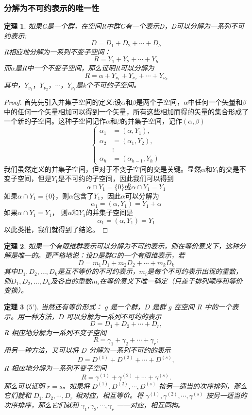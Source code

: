 \documentclass{ctexart}%
\newtheorem{theorem}{定理}
\begin{document}
\subsubsection{分解为不可约表示的唯一性}
\begin{theorem}
    如果G是一个群，在空间R中群G有一个表示D，D可以分解为一系列不可约表示:
    \[D = D_1+D_2+\cdots + D_h\]
    R相应地分解为一系列不变子空间：
    \[R = Y_1+Y_2+\cdots + Y_h\]
    而$\alpha$是R中一个不变子空间，那么证明R可以分解为
    \[R= \alpha+Y_{\nu_1}+Y_{\nu_2}+\cdots+Y_{\nu_k}\]
    其中，$Y_{\nu_1}，Y_{\nu_2}，\cdots，Y_{\nu_k}$是k个不可约子空间。
\end{theorem}
\begin{proof}
    首先先引入并集子空间的定义:设$\alpha$和$\beta$是两个子空间，$\alpha$中任何一个矢量和$\beta$中的任何一个矢量相加可以得到一个矢量，所有这些相加而得的矢量的集合形成了一个新的子空间。这种子空间记作$\alpha$和$\beta$的并集子空间，记作$\left( \alpha , \beta \right)$
    \[
    \left\{
    \begin{aligned}
        \alpha_1 &= \left(\alpha,Y_1\right) ,\\
        \alpha_2 &=\left(\alpha_1,Y_2\right) ,\\
        &\vdots \\
        \alpha_h &=\left(\alpha_{h-1},Y_h\right)
    \end{aligned}
    \right.
    \]
    我们虽然定义的并集子空间，但对于不变子空间的交是关键。显然$\alpha$和$Y_1$的交是不变子空间，但是$Y_1$是不可约的子空间，因此我们可以得到
    \[\alpha \cap Y_1 = \{0\} \text{或} \alpha \cap Y_1 = Y_1\]
    如果$\alpha \cap Y_1 = \{0\}$，则$\alpha$包含了$Y_1$，因此$\alpha$可以分解为
    \[  
    \alpha_1 = \left(\alpha,Y_1\right) = Y_1 + \alpha
    \]
    如果$\alpha \cap Y_1  = Y_1$，
    则$\alpha$和$Y_1$的并集子空间是
    \[  
    \alpha_1 = \left(\alpha,Y_1\right) = Y_1 
    \]
    以此类推，我们就得到了结论。
\end{proof}
\begin{theorem}
    如果一个有限维群表示可以分解为不可约表示，则在等价意义下，这种分解是唯一的。更严格地说：设$D$是群$G$的一个有限维表示，若
    \[
        D = m_1 D_1 + m_2 D_2 + \cdots + m_k D_k
    \]
    其中$D_1, D_2, \ldots, D_k$是互不等价的不可约表示，$m_i$是每个不可约表示出现的重数，则$D_1, D_2, \ldots, D_k$及各自的重数$m_i$在等价意义下唯一确定（只差于排列顺序和等价变换）。
\end{theorem}
\begin{theorem}[5']
当然还有等价形式：
\( g \) 是一个群，\( D \) 是群 \( g \) 在空间 \( R \) 中的一个表示。用一种方法，\( D \) 可以分解为一系列不可约的表示
\[
D = D_1 + D_2 + \cdots + D_r,
\]
R 相应地分解为一系列不变子空间
\[
R = \gamma_1 + \gamma_2 + \cdots + \gamma_r;
\]
用另一种方法，又可以将 \( D \) 分解为一系列不可约的表示
\[
D = D^{(1)} + D^{(2)} + \cdots + D^{(s)},
\]
R 相应地分解为一系列不变子空间
\[
R = \gamma^{(1)} + \gamma^{(2)} + \cdots + \gamma^{(s)}.
\]
那么可以证明 \( r = s \)。如果将 \( D^{(1)}, D^{(2)}, \cdots, D^{(s)} \) 按另一适当的次序排列，那么它们就和 \( D_1, D_2, \cdots, D_r \) 相对应，相互等价。将 \( \gamma^{(1)}, \gamma^{(2)}, \cdots, \gamma^{(s)} \) 按另一适当的次序排序，那么它们就和 \( \gamma_1, \gamma_2, \cdots, \gamma_r \) 一一对应，相互同构。
\end{theorem}
\end{document}
